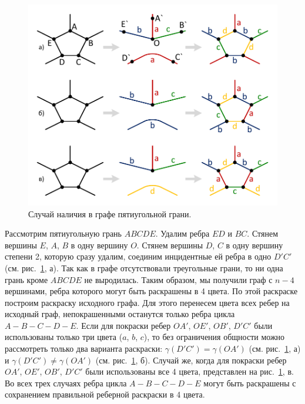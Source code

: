 \begin{figure}[ht]
\centering
\includegraphics[width=1.0\textwidth]{fig/par_coloring4_face5.pdf}
\singlespacing
{}\caption{Случай наличия в графе пятиугольной грани.}
\label{fig:text_3_graph_prim_coloring4_face5}
\end{figure}

Рассмотрим пятиугольную грань $ABCDE$.
Удалим ребра $ED$ и $BC$.
Стянем вершины $E$, $A$, $B$ в одну вершину $O$.
Стянем вершины $D$, $C$ в одну вершину степени 2, которую сразу удалим, соединим инцидентные ей ребра в одно $D'C'$ (см. рис.~\ref{fig:text_3_graph_prim_coloring4_face5}, а).
Так как в графе отсутствовали треугольные грани, то ни одна грань кроме $ABCDE$ не выродилась.
Таким образом, мы получили граф с $n - 4$ вершинами, ребра которого могут быть раскрашены в 4 цвета.
По этой раскраске построим раскраску исходного графа.
Для этого перенесем цвета всех ребер на исходный граф, непокрашенными останутся только ребра цикла $A-B-C-D-E$.
Если для покраски ребер $OA'$, $OE'$, $OB'$, $D'C'$ были использованы только три цвета ($a$, $b$, $c$), то без ограничения общности можно рассмотреть только два варианта раскраски: $\gamma(D'C') = \gamma(OA')$ (см. рис.~\ref{fig:text_3_graph_prim_coloring4_face5}, а) и $\gamma(D'C') \ne \gamma(OA')$ (см. рис.~\ref{fig:text_3_graph_prim_coloring4_face5}, б). 
Случай же, когда для покраски ребер $OA'$, $OE'$, $OB'$, $D'C'$ были использованы все 4 цвета, представлен на рис.~\ref{fig:text_3_graph_prim_coloring4_face5}, в.
Во всех трех случаях ребра цикла $A-B-C-D-E$ могут быть раскрашены с сохранением правильной реберной раскраски в 4 цвета.

